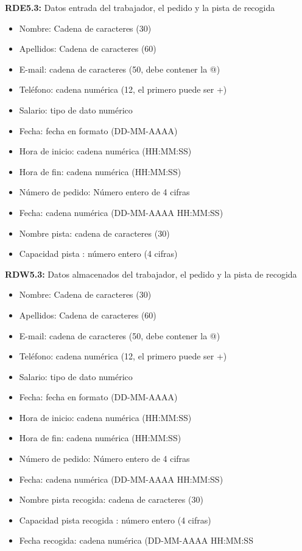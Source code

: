 \textbf{RDE5.3:} Datos entrada del trabajador, el pedido y la pista de recogida
\begin{itemize}
	\item Nombre: Cadena de caracteres (30)
    \item Apellidos: Cadena de caracteres (60)
    \item E-mail: cadena de caracteres (50, debe contener la @)
    \item Teléfono: cadena numérica (12, el primero puede ser +)
    \item Salario: tipo de dato numérico
\newline    
    \item Fecha: fecha en formato (DD-MM-AAAA)    
    \item Hora de inicio: cadena numérica (HH:MM:SS)
    \item Hora de fin: cadena numérica (HH:MM:SS)
\newline
    \item Número de pedido: Número entero de 4 cifras
	\item Fecha: cadena numérica (DD-MM-AAAA HH:MM:SS)
\newline
    \item Nombre pista: cadena de caracteres (30)
	\item Capacidad pista : número entero (4 cifras)
\end{itemize}

\textbf{RDW5.3:} Datos almacenados del trabajador, el pedido y la pista de recogida
\begin{itemize}
	\item Nombre: Cadena de caracteres (30)
    \item Apellidos: Cadena de caracteres (60)
    \item E-mail: cadena de caracteres (50, debe contener la @)
    \item Teléfono: cadena numérica (12, el primero puede ser +)
    \item Salario: tipo de dato numérico
\newline    
    \item Fecha: fecha en formato (DD-MM-AAAA)    
    \item Hora de inicio: cadena numérica (HH:MM:SS)
    \item Hora de fin: cadena numérica (HH:MM:SS)
\newline
    \item Número de pedido: Número entero de 4 cifras
	\item Fecha: cadena numérica (DD-MM-AAAA HH:MM:SS)
\newline
    \item Nombre pista recogida: cadena de caracteres (30)
	\item Capacidad pista recogida : número entero (4 cifras)
	\item Fecha recogida: cadena numérica (DD-MM-AAAA HH:MM:SS
\end{itemize}

